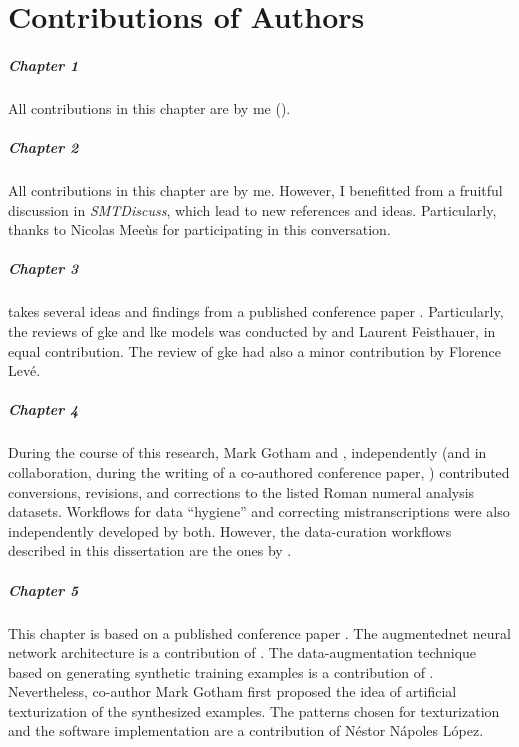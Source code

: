 \chapter*{Contributions of Authors}
\label{chap:contributionsofauthors}

\paragraph{Chapter 1}
All contributions in this chapter are by me (\myself{}).

\paragraph{Chapter 2}
All contributions in this chapter are by me. However, I
benefitted from a fruitful discussion in
\emph{SMTDiscuss},
which lead to new references and ideas. Particularly, thanks
to Nicolas Mee\`us for participating in this conversation.

\paragraph{Chapter 3} 
 takes several ideas and findings
from a published conference paper
\parencite{napoleslopez2020local}. Particularly, the reviews
of \gls{gke} and \gls{lke} models was conducted by \myself{}
and Laurent Feisthauer, in equal contribution. The review of
\gls{gke} had also a minor contribution by Florence Lev\'e.

\paragraph{Chapter 4} 
During the course of this research, Mark Gotham and
\myself{}, independently (and in collaboration, during the
writing of a co-authored conference paper,
\textcite{napoleslopez2021augmentednet}) contributed
conversions, revisions, and corrections to the listed Roman
numeral analysis datasets. Workflows for data ``hygiene''
and correcting mistranscriptions were also independently
developed by both. However, the data-curation workflows
described in this dissertation are the ones by \myself{}. 

\paragraph{Chapter 5}
This chapter is based on a published conference paper
\parencite{napoleslopez2021augmentednet}. The
\gls{augmentednet} neural network architecture is a
contribution of \myself{}. The data-augmentation technique
based on generating synthetic training examples is a
contribution of \myself{}. Nevertheless, co-author Mark
Gotham first proposed the idea of artificial texturization
of the synthesized examples. The patterns chosen for
texturization and the software implementation are a
contribution of N\'estor N\'apoles L\'opez.

